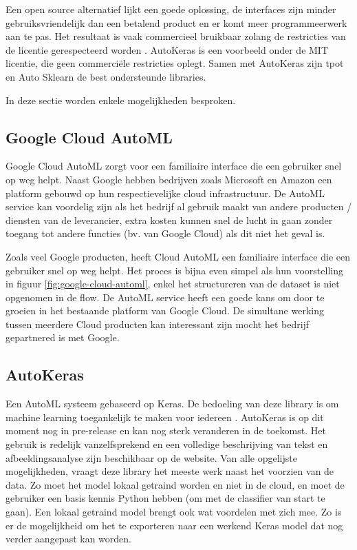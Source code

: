 Een open source alternatief lijkt een goede oplossing, de interfaces zijn minder gebruiksvriendelijk dan een betalend product en er komt meer programmeerwerk aan te pas. Het resultaat is vaak commercieel bruikbaar zolang de restricties van de licentie gerespecteerd worden \autocite{Balter2015}. AutoKeras is een voorbeeld onder de MIT licentie, die geen commerciële restricties oplegt. Samen met AutoKeras zijn tpot en Auto Sklearn de best ondersteunde libraries.

In deze sectie worden enkele mogelijkheden besproken.

\subsection{Google Cloud AutoML}
\label{subsec:google-automl}

Google Cloud AutoML zorgt voor een familiaire interface die een gebruiker snel op weg helpt. Naast Google hebben bedrijven zoals Microsoft en Amazon een platform gebouwd op hun respectievelijke cloud infrastructuur. De AutoML service kan voordelig zijn als het bedrijf al gebruik maakt van andere producten / diensten van de leverancier, extra kosten kunnen snel de lucht in gaan zonder toegang tot andere functies (bv. van Google Cloud) als dit niet het geval is. 

Zoals veel Google producten, heeft Cloud AutoML een familiaire interface die een gebruiker snel op weg helpt. Het proces is bijna even simpel als hun voorstelling in figuur \ref{fig:google-cloud-automl}, enkel het structureren van de dataset is niet opgenomen in de flow. De AutoML service heeft een goede kans om door te groeien in het bestaande platform van Google Cloud. De simultane werking tussen meerdere Cloud producten kan interessant zijn mocht het bedrijf gepartnered is met Google.

\subsection{AutoKeras}
\label{subsec:autokeras}

Een AutoML systeem gebaseerd op Keras. De bedoeling van deze library is om machine learning toegankelijk te maken voor iedereen \autocite{jin2019}. AutoKeras is op dit moment nog in pre-release en kan nog sterk veranderen in de toekomst. Het gebruik is redelijk vanzelfsprekend en een volledige beschrijving van tekst en afbeeldingsanalyse zijn beschikbaar op de website. Van alle opgelijste mogelijkheden, vraagt deze library het meeste werk naast het voorzien van de data. Zo moet het model lokaal getraind worden en niet in de cloud, en moet de gebruiker een basis kennis Python hebben (om met de classifier van start te gaan). Een lokaal getraind model brengt ook wat voordelen met zich mee. Zo is er de mogelijkheid om het te exporteren naar een werkend Keras model dat nog verder aangepast kan worden. 

